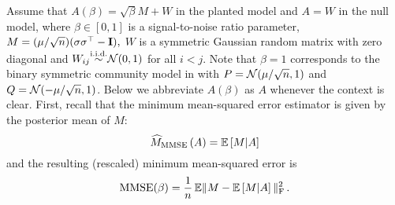 





Assume that $A(\beta) = \sqrt{\beta} M+W$ 
in the planted model and $A=W$ in the null model, 
where $\beta \in [0,1]$ is a signal-to-noise ratio parameter, 
$
M=(\mu/\sqrt{n}) (\sigma \sigma^\top -\mathbf I),
$ 
$W$ is a symmetric Gaussian random matrix with zero diagonal and
$W_{ij} {\stackrel{\text{i.i.d.}}{\sim}} {\mathcal{N}}(0, 1)$ for all $i<j$. 
Note that $\beta=1$ corresponds to 
the binary symmetric community model in  with $P={\mathcal{N}}(\mu/\sqrt{n},1)$
and $Q={\mathcal{N}}( -\mu/\sqrt{n},1)$. Below we abbreviate $A(\beta)$ as $A$ whenever the
context is clear. 
First, recall that the minimum mean-squared error estimator is given by
the posterior mean of $M$:
$$
\widehat{M}_{\rm MMSE}\left(A \right)  = \mathbb{E}\left[ M | A   \right]
$$
and the resulting (rescaled) minimum mean-squared error is
\begin{equation}
\label{eq:mmse-def}
	{\rm MMSE}(\beta) = \frac{1}{n} \,\mathbb{E} \| M - \mathbb{E}\left[ M| A  \right] \|_{\rm F}^2 \, .
\end{equation}

